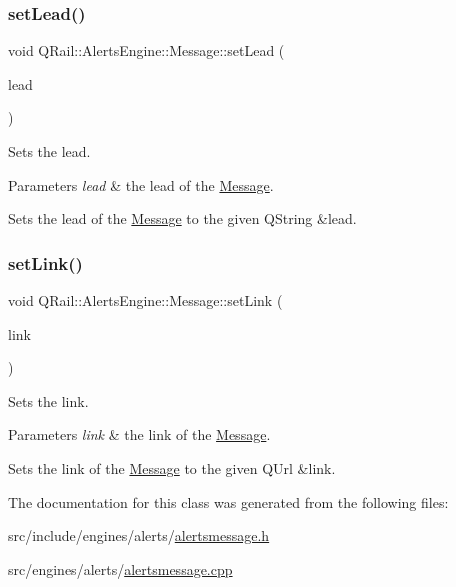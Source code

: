 \subsubsection{\texorpdfstring{setLead()}{setLead()}}
{\footnotesize\ttfamily void Q\+Rail\+::\+Alerts\+Engine\+::\+Message\+::set\+Lead (\begin{DoxyParamCaption}\item[{const Q\+String \&}]{lead }\end{DoxyParamCaption})}



Sets the lead. 


\begin{DoxyParams}{Parameters}
{\em lead} & the lead of the \mbox{\hyperlink{classQRail_1_1AlertsEngine_1_1Message}{Message}}.\\
\hline
\end{DoxyParams}
Sets the lead of the \mbox{\hyperlink{classQRail_1_1AlertsEngine_1_1Message}{Message}} to the given Q\+String \&lead. \mbox{\label{classQRail_1_1AlertsEngine_1_1Message_aa4c1f5cd9f81e74b7dd7a43c18e267cf}} 
\subsubsection{\texorpdfstring{setLink()}{setLink()}}
{\footnotesize\ttfamily void Q\+Rail\+::\+Alerts\+Engine\+::\+Message\+::set\+Link (\begin{DoxyParamCaption}\item[{const Q\+Url \&}]{link }\end{DoxyParamCaption})}



Sets the link. 


\begin{DoxyParams}{Parameters}
{\em link} & the link of the \mbox{\hyperlink{classQRail_1_1AlertsEngine_1_1Message}{Message}}.\\
\hline
\end{DoxyParams}
Sets the link of the \mbox{\hyperlink{classQRail_1_1AlertsEngine_1_1Message}{Message}} to the given Q\+Url \&link. 

The documentation for this class was generated from the following files\+:\begin{DoxyCompactItemize}
\item 
src/include/engines/alerts/\mbox{\hyperlink{alertsmessage_8h}{alertsmessage.\+h}}\item 
src/engines/alerts/\mbox{\hyperlink{alertsmessage_8cpp}{alertsmessage.\+cpp}}\end{DoxyCompactItemize}

